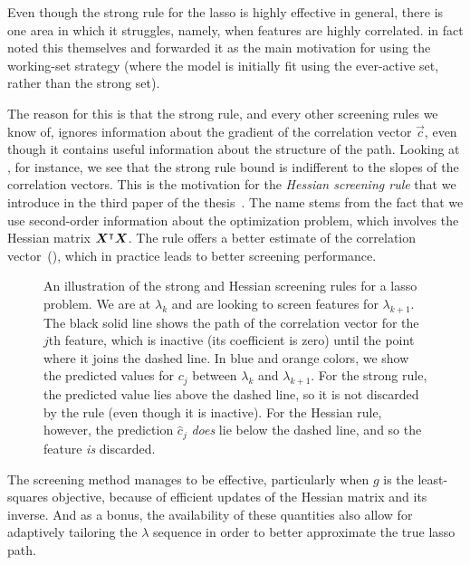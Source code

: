 Even though the strong rule for the lasso is highly effective in general, there is one area in which it struggles, namely, when features are highly correlated. \textcite{tibshirani2012} in fact noted this themselves and forwarded it as the main motivation for using the working-set strategy (where the model is initially fit using the ever-active set, rather than the strong set).

The reason for this is that the strong rule, and every other screening rules we know of, ignores information about the gradient of the correlation vector \(\vec{c}\), even though it contains useful information about the structure of the path. Looking at , for instance, we see that the strong rule bound is indifferent to the slopes of the correlation vectors. This is the motivation for the \emph{Hessian screening rule} that we introduce in the third paper of the thesis~\parencite{larsson2022b}. The name stems from the fact that we use second-order information about the optimization problem, which involves the Hessian matrix \(\boldsymbol{X}^\intercal\boldsymbol{X}\). The rule offers a better estimate of the correlation vector~(), which in practice leads to better screening performance.

\begin{figure}[tpb]
  \centering
  \pgfplotsset{width=11.5cm,height=9cm}
  
  \caption{%
    An illustration of the strong and Hessian screening rules for a lasso problem. We are at \(\lambda_k\) and are looking to screen features for \(\lambda_{k+1}\). The black solid line shows the path of the correlation vector for the \(j\)th feature, which is inactive (its coefficient is zero) until the point where it joins the dashed line. In blue and orange colors, we show the predicted values for \(c_j\) between \(\lambda_k\) and \(\lambda_{k+1}\). For the strong rule, the predicted value lies above the dashed line, so it is not discarded by the rule (even though it is inactive). For the Hessian rule, however, the prediction \(\hat{c}_j\) \emph{does} lie below the dashed line, and so the feature \emph{is} discarded.
  }
  \label{fig:paper3-highlight}
\end{figure}

The screening method manages to be effective, particularly when \(g\) is the least-squares objective, because of efficient updates of the Hessian matrix and its inverse. And as a bonus, the availability of these quantities also allow for adaptively tailoring the \(\lambda\) sequence in order to better approximate the true lasso path.

